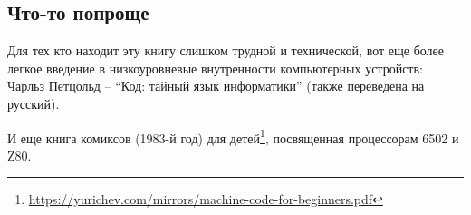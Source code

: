 

\subsection{Что-то попроще}

Для тех кто находит эту книгу слишком трудной и технической,
вот еще более легкое введение в низкоуровневые внутренности компьютерных устройств:
Чарльз Петцольд -- ``Код: тайный язык информатики'' (также переведена на русский).

И еще книга комиксов (1983-й год) для детей\footnote{\url{https://yurichev.com/mirrors/machine-code-for-beginners.pdf}},
посвященная процессорам 6502 и Z80.

